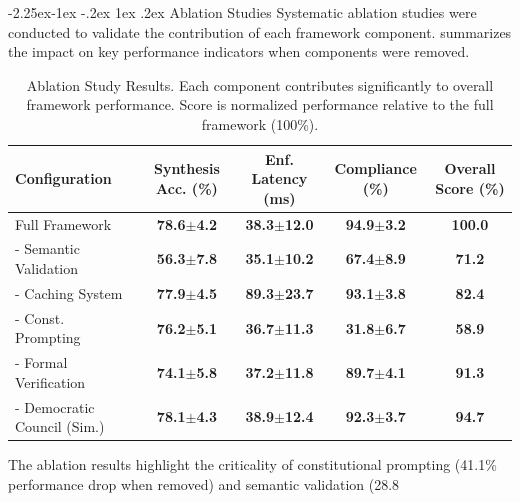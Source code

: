 \documentclass[manuscript,screen,review,anonymous,9pt]{acmart}
\makeatletter
\renewcommand\subsection{\@startsection{subsection}{2}{\z@}%
  {-2.25ex\@plus -1ex \@minus -.2ex}%
  {1ex \@plus .2ex}%
  {\normalfont\large\bfseries}}
\newcommand{\tablesize}{\footnotesize} %
\newcommand{\tablenumfmt}[1]{\textbf{#1}}
\newcommand{\tableheader}[1]{\textbf{#1}}
\makeatother
\begin{document}
\subsection{Ablation Studies}
\label{subsec:ablation_studies}
Systematic ablation studies were conducted to validate the contribution of each framework component.  summarizes the impact on key performance indicators when components were removed.
\begin{table}[htbp]
\centering
\caption{Ablation Study Results. Each component contributes significantly to overall framework performance. Score is normalized performance relative to the full framework (100\%).}
\label{tab:ablation_results}
\tablesize
\begin{tabular}{@{}lcccc@{}}
\toprule
\tableheader{Configuration} & \tableheader{Synthesis Acc. (\%)} & \tableheader{Enf. Latency (ms)} & \tableheader{Compliance (\%)} & \tableheader{Overall Score (\%)} \\
\midrule
Full Framework        & \tablenumfmt{78.6$\pm$4.2} & \tablenumfmt{38.3$\pm$12.0} & \tablenumfmt{94.9$\pm$3.2} & \textbf{\tablenumfmt{100.0}} \\
\midrule
- Semantic Validation & \tablenumfmt{56.3$\pm$7.8} & \tablenumfmt{35.1$\pm$10.2} & \tablenumfmt{67.4$\pm$8.9} & \tablenumfmt{71.2} \\
- Caching System      & \tablenumfmt{77.9$\pm$4.5} & \tablenumfmt{89.3$\pm$23.7} & \tablenumfmt{93.1$\pm$3.8} & \tablenumfmt{82.4} \\
- Const. Prompting    & \tablenumfmt{76.2$\pm$5.1} & \tablenumfmt{36.7$\pm$11.3} & \tablenumfmt{31.8$\pm$6.7} & \tablenumfmt{58.9} \\ %
- Formal Verification   & \tablenumfmt{74.1$\pm$5.8} & \tablenumfmt{37.2$\pm$11.8} & \tablenumfmt{89.7$\pm$4.1} & \tablenumfmt{91.3} \\
- Democratic Council (Sim.) & \tablenumfmt{78.1$\pm$4.3} & \tablenumfmt{38.9$\pm$12.4} & \tablenumfmt{92.3$\pm$3.7} & \tablenumfmt{94.7} \\
\bottomrule
\end{tabular}
\end{table}
The ablation results highlight the criticality of constitutional prompting (41.1\% performance drop when removed) and semantic validation (28.8%
\end{document}
